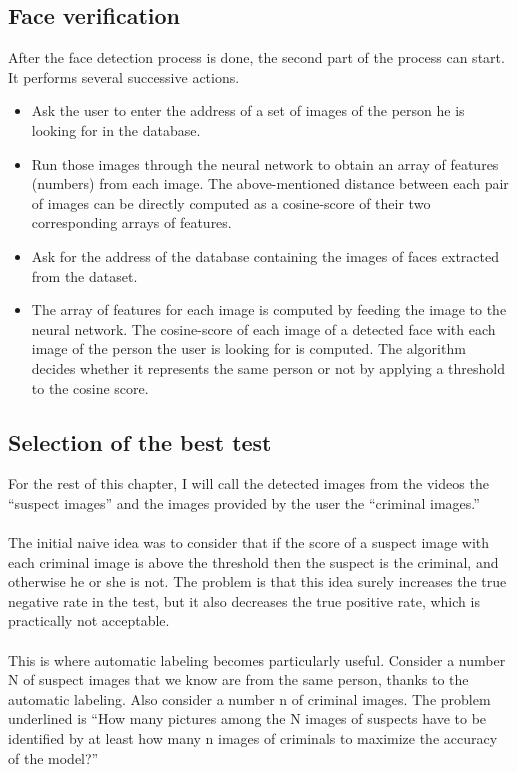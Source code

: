 \subsection{Face verification}
After the face detection process is done, the second part of the process can start.
It performs several successive actions.
\begin{itemize}
\item Ask the user to enter the address of a set of images of the person he is looking for in the database.
\item Run those images through the neural network to obtain an array of features (numbers) from each image. The above-mentioned distance between each pair of images can be directly computed as a cosine-score of their two corresponding arrays of features.
\item Ask for the address of the database containing the images of faces extracted from the dataset.
\item The array of features for each image is computed by feeding the image to the neural network. The cosine-score of each image of a detected face with each image of the person the user is looking for is computed. The algorithm decides whether it represents the same person or not by applying a threshold to the cosine score.
\end{itemize}
\subsection{Selection of the best test}
For the rest of this chapter, I will call the detected images from the videos the \enquote{suspect images} and the images provided by the user the \enquote{criminal images.}\\
\\
The initial naive idea was to consider that if the score of a suspect image with each criminal image is above the threshold then the suspect is the criminal, and otherwise he or she is not. The problem is that this idea surely increases the true negative rate in the test, but it also decreases the true positive rate, which is practically not acceptable.\\
\\
This is where automatic labeling becomes particularly useful. Consider a number N of suspect images that we know are from the same person, thanks to the automatic labeling.
Also consider a number n of criminal images.
The problem underlined is \enquote{How many pictures among the N images of suspects have to be identified by at least how many n images of criminals to maximize the accuracy of the model?}


